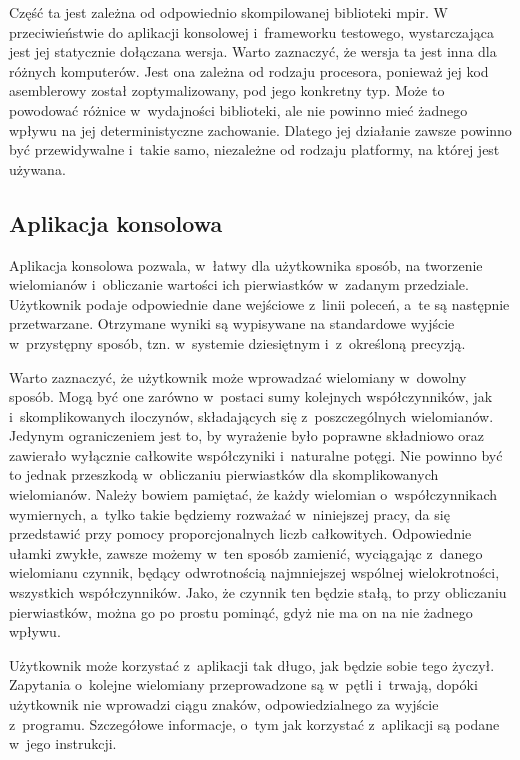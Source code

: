 Część ta jest zależna od odpowiednio skompilowanej biblioteki mpir. W przeciwieństwie do aplikacji konsolowej i~frameworku testowego, wystarczająca jest jej statycznie dołączana wersja. Warto zaznaczyć, że wersja ta jest inna dla różnych komputerów. Jest ona zależna od rodzaju procesora, ponieważ jej kod asemblerowy został zoptymalizowany, pod jego konkretny typ. Może to powodować różnice w~wydajności biblioteki, ale nie powinno mieć żadnego wpływu na jej deterministyczne zachowanie. Dlatego jej działanie zawsze powinno być przewidywalne i~takie samo, niezależne od rodzaju platformy, na której jest używana.

\subsection{Aplikacja konsolowa}

Aplikacja konsolowa pozwala, w~łatwy dla użytkownika sposób, na tworzenie wielomianów i~obliczanie wartości ich pierwiastków w~zadanym przedziale. Użytkownik podaje odpowiednie dane wejściowe z~linii poleceń, a~te są następnie przetwarzane. Otrzymane wyniki są wypisywane na standardowe wyjście w~przystępny sposób, tzn. w~systemie dziesiętnym i~z~określoną precyzją.

Warto zaznaczyć, że użytkownik może wprowadzać wielomiany w~dowolny sposób. Mogą być one zarówno w~postaci sumy kolejnych współczynników, jak i~skomplikowanych iloczynów, składających się z~poszczególnych wielomianów. Jedynym ograniczeniem jest to, by wyrażenie było poprawne składniowo oraz zawierało wyłącznie całkowite współczyniki i~naturalne potęgi. Nie powinno być to jednak przeszkodą w~obliczaniu pierwiastków dla skomplikowanych wielomianów. Należy bowiem pamiętać, że każdy wielomian o~współczynnikach wymiernych, a~tylko takie będziemy rozważać w~niniejszej pracy, da się przedstawić przy pomocy proporcjonalnych liczb całkowitych. Odpowiednie ułamki zwykłe, zawsze możemy w~ten sposób zamienić, wyciągając z~danego wielomianu czynnik, będący odwrotnością najmniejszej wspólnej wielokrotności, wszystkich współczynników. Jako, że czynnik ten będzie stałą, to przy obliczaniu pierwiastków, można go po prostu pominąć, gdyż nie ma on na nie żadnego wpływu.

Użytkownik może korzystać z~aplikacji tak długo, jak będzie sobie tego życzył. Zapytania o~kolejne wielomiany przeprowadzone są w~pętli i~trwają, dopóki użytkownik nie wprowadzi ciągu znaków, odpowiedzialnego za wyjście z~programu. Szczegółowe informacje, o~tym jak korzystać z~aplikacji są podane w~jego instrukcji.

